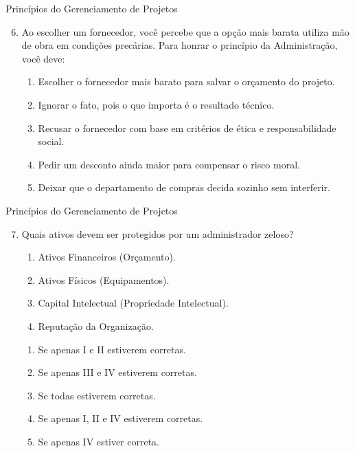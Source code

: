 \documentclass{beamer}
\begin{document}
\begin{frame}{Princípios do Gerenciamento de Projetos}
	\begin{enumerate}
		\setcounter{enumi}{5}
		\justifying
		\item Ao escolher um fornecedor, você percebe que a opção mais barata utiliza mão de obra em condições precárias. Para honrar o princípio da Administração, você deve:
		\begin{enumerate}[a]
			\item Escolher o fornecedor mais barato para salvar o orçamento do projeto.
			\item Ignorar o fato, pois o que importa é o resultado técnico.
			\item \alert<2>{Recusar o fornecedor com base em critérios de ética e responsabilidade social.}
			\item Pedir um desconto ainda maior para compensar o risco moral.
			\item Deixar que o departamento de compras decida sozinho sem interferir.
		\end{enumerate}
	\end{enumerate}
\end{frame}

\begin{frame}{Princípios do Gerenciamento de Projetos}
	\begin{enumerate}
		\setcounter{enumi}{6}
		\justifying
		\item Quais ativos devem ser protegidos por um administrador zeloso?
		\begin{enumerate}[I]
			\item Ativos Financeiros (Orçamento).
			\item Ativos Físicos (Equipamentos).
			\item Capital Intelectual (Propriedade Intelectual).
			\item Reputação da Organização.
		\end{enumerate}
		\begin{enumerate}[a]
			\item Se apenas I e II estiverem corretas.
			\item Se apenas III e IV estiverem corretas.
			\item \alert<2>{Se todas estiverem corretas.}
			\item Se apenas I, II e IV estiverem corretas.
			\item Se apenas IV estiver correta.
		\end{enumerate}
	\end{enumerate}
\end{frame}
\end{document}
